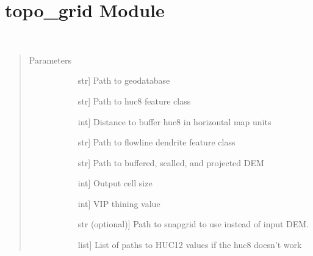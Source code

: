 \documentclass[letterpaper,10pt,english]{sphinxmanual}
\begin{document}
\section{topo\_grid Module}
\label{\detokenize{topo_grid:module-topo_grid}}\label{\detokenize{topo_grid:topo-grid-module}}\label{\detokenize{topo_grid::doc}}

\begin{fulllineitems}
\label{\detokenize{topo_grid:topo_grid.topogrid}}~\begin{quote}\begin{description}
\item[{Parameters}] \leavevmode\begin{description}
\item[{}] \leavevmode{[}str{]}
Path to geodatabase

\item[{}] \leavevmode{[}str{]}
Path to huc8 feature class

\item[{}] \leavevmode{[}int{]}
Distance to buffer huc8 in horizontal map units

\item[{}] \leavevmode{[}str{]}
Path to flowline dendrite feature class

\item[{}] \leavevmode{[}str{]}
Path to buffered, scalled, and projected DEM

\item[{}] \leavevmode{[}int{]}
Output cell size

\item[{}] \leavevmode{[}int{]}
VIP thining value

\item[{}] \leavevmode{[}str (optional){]}
Path to snapgrid to use instead of input DEM.

\item[{}] \leavevmode{[}list{]}
List of paths to HUC12 values if the huc8 doesn’t work


\end{description}
\end{description}
\end{quote}
\end{fulllineitems}
\end{document}
